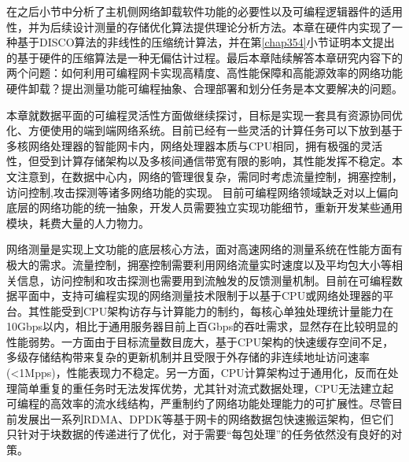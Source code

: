 
在之后小节中分析了主机侧网络卸载软件功能的必要性以及可编程逻辑器件的适用性，并为后续设计测量的存储优化算法提供理论分析方法。本章在硬件内实现了一种基于DISCO算法的非线性的压缩统计算法，并在第\ref{chap354}小节证明本文提出的基于硬件的压缩算法是一种无偏估计过程。最后本章陆续解答本章研究内容下的两个问题：如何利用可编程网卡实现高精度、高性能保障和高能源效率的网络功能硬件卸载？提出测量功能可编程抽象、合理部署和划分任务是本文要解决的问题。





\label{chap32}





本章就数据平面的可编程灵活性方面做继续探讨，目标是实现一套具有资源协同优化、方便使用的端到端网络系统。目前已经有一些灵活的计算任务可以下放到基于多核网络处理器的智能网卡内，网络处理器本质与CPU相同，拥有极强的灵活性，但受到计算存储架构以及多核间通信带宽有限的影响，其性能发挥不稳定。本文注意到，在数据中心内，网络的管理很复杂，需同时考虑流量控制，拥塞控制，访问控制,攻击探测等诸多网络功能的实现。
目前可编程网络领域缺乏对以上偏向底层的网络功能的统一抽象，开发人员需要独立实现功能细节，重新开发某些通用模块，耗费大量的人力物力。



网络测量是实现上文功能的底层核心方法，面对高速网络的测量系统在性能方面有极大的需求。流量控制，拥塞控制需要利用网络流量实时速度以及平均包大小等相关信息，访问控制和攻击探测也需要用到流触发的反馈测量机制。目前在可编程数据平面中，支持可编程实现的网络测量技术限制于以基于CPU或网络处理器的平台。其性能受到CPU架构访存与计算能力的制约，每核心单独处理统计量能力在10Gbps以内，相比于通用服务器目前上百Gbps的吞吐需求，显然存在比较明显的性能弱势。一方面由于目标流量数目庞大，基于CPU架构的快速缓存空间不足，多级存储结构带来复杂的更新机制并且受限于外存储的非连续地址访问速率(<1Mpps)，性能表现力不稳定。另一方面，CPU计算架构过于通用化，反而在处理简单重复的重任务时无法发挥优势，尤其针对流式数据处理，CPU无法建立起可编程的高效率的流水线结构，严重制约了网络功能处理能力的可扩展性。尽管目前发展出一系列RDMA、DPDK等基于网卡的网络数据包快速搬运架构，但它们只针对于块数据的传递进行了优化，对于需要“每包处理”的任务依然没有良好的对策。

